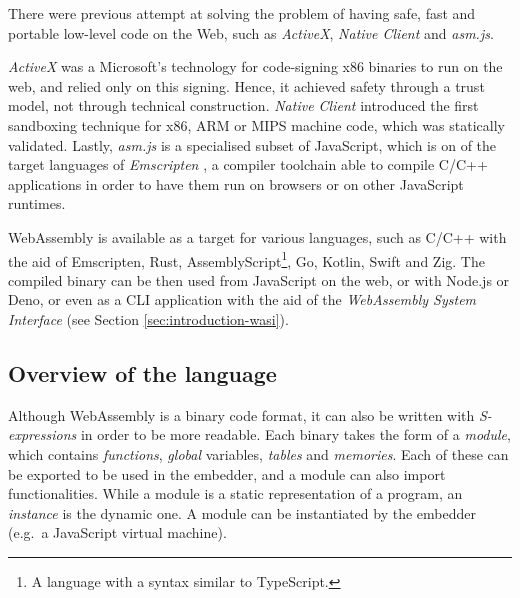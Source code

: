 There were previous attempt at solving the problem of having safe, fast and portable low-level code on the Web,
such as \textit{ActiveX}, \textit{Native Client} and \textit{asm.js}.

\textit{ActiveX} \cite{activex} was a Microsoft's technology for code-signing x86 binaries to run on the web, and relied only
on this signing. Hence, it achieved safety through a trust model, not through technical construction.
\textit{Native Client} \cite{native-client} introduced the first sandboxing technique for x86, ARM or MIPS machine code,
which was statically validated. Lastly, \textit{asm.js} \cite{asmjs} is a specialised subset of JavaScript, which is on of the target
languages of \textit{Emscripten} \cite{emscripten}, a compiler toolchain able to compile C/C++ applications in order to have them
run on browsers or on other JavaScript runtimes.

WebAssembly is available as a target for various languages, such as C/C++ with the aid of Emscripten, Rust,
AssemblyScript\footnote{A language with a syntax similar to TypeScript.}, Go, Kotlin, Swift and Zig.
The compiled binary can be then used from JavaScript on the web, or with Node.js or Deno, or even as a CLI application
with the aid of the \textit{WebAssembly System Interface} (see Section \ref*{sec:introduction-wasi}).

\subsection{Overview of the language}

Although WebAssembly is a binary code format, it can also be written with \textit{S-expressions}
in order to be more readable.
Each binary takes the form of a \textit{module}, which contains \textit{functions}, \textit{global} variables,
\textit{tables} and \textit{memories}. Each of these can be exported to be used in the embedder, and a module can also import functionalities.
While a module is a static representation of a program, an \textit{instance} is the dynamic one.
A module can be instantiated by the embedder (e.g.\ a JavaScript virtual machine).


